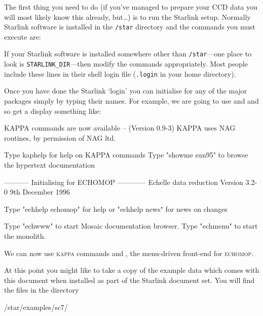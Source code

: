 \documentclass[twoside,11pt]{starlink}
\providecommand{\scspec}[2]{#1}
\begin{document}
The first thing you need to do (if you've managed to prepare your CCD
data you will most likely know this already, but\ldots ) is to run the
Starlink setup.
Normally Starlink software is installed in the \verb+/star+ directory
and the commands you must execute are:

{
\scspec{\small}{ }
\begin{terminalv}
\end{terminalv}
}

If your Starlink software is installed somewhere other than
\verb+/star+---one place to look is \verb+STARLINK_DIR+---then
modify the commands appropriately.  Most people include these lines in
their shell login file (\verb+.login+ in your home directory).

Once you have done the Starlink `login' you can initialise for any of the
major packages simply by typing their names.
For example, we are going to use
\cite{kappa} and
\cite{echomop} and so get a display
something like:

{
\scspec{\small}{ }
\begin{terminalv}

  KAPPA commands are now available -- (Version 0.9-3)
  KAPPA uses NAG routines, by permission of NAG ltd.

  Type kaphelp for help on KAPPA commands
  Type "showme sun95" to browse the hypertext documentation

 ----------- Initialising for ECHOMOP ------------
              Echelle data reduction
         Version 3.2-0  9th December 1996

          Type "echhelp echomop" for help
    or "echhelp news" for news on changes

 Type "echwww" to start Mosaic documentation browser.
 Type "echmenu" to start the monolith.
\end{terminalv}
}

We can now use \textsc{kappa} commands and
,
the menu-driven front-end for \textsc{echomop}.

At this point you might like to take a copy of the example data which comes
with this document when installed as part of the Starlink document set.
You will find the files in the directory

{
\scspec{\small}{ }
\begin{terminalv}
/star/examples/sc7/
\end{terminalv}
}
\end{document}
